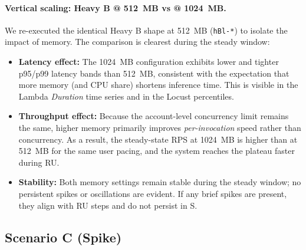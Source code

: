 \documentclass[11pt,a4paper]{article}
\begin{document}
\paragraph{Vertical scaling: Heavy B @ \SI{512}{MB} vs @ \SI{1024}{MB}.}
We re-executed the identical Heavy B shape at \SI{512}{MB} (\texttt{hBl-*}) to isolate the impact of memory. The comparison is clearest during the steady window:
\begin{itemize}
  \item \textbf{Latency effect:} The \SI{1024}{MB} configuration exhibits lower and tighter p95/p99 latency bands than \SI{512}{MB}, consistent with the expectation that more memory (and CPU share) shortens inference time. This is visible in the Lambda \emph{Duration} time series and in the Locust percentiles.
  \item \textbf{Throughput effect:} Because the account-level concurrency limit remains the same, higher memory primarily improves \emph{per-invocation} speed rather than concurrency. As a result, the steady-state RPS at \SI{1024}{MB} is higher than at \SI{512}{MB} for the same user pacing, and the system reaches the plateau faster during RU.
  \item \textbf{Stability:} Both memory settings remain stable during the steady window; no persistent spikes or oscillations are evident. If any brief spikes are present, they align with RU steps and do not persist in S.
\end{itemize}



\subsection{Scenario C (Spike)}\label{subsec:resC}
\end{document}
